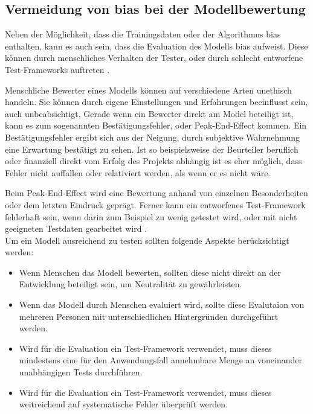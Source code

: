 \documentclass[hidelinks,12pt]{report}
\begin{document}
\subsection{Vermeidung von \Gls{bias}  bei der Modellbewertung}
Neben der Möglichkeit, dass die Trainingsdaten oder der Algorithmus \Gls{bias}  enthalten, kann es auch sein, dass die Evaluation des Modells \Gls{bias}  aufweist.
Diese können durch menschliches Verhalten der Tester, oder durch schlecht entworfene Test-Frameworks auftreten \cite[S. 54f.]{Srinivasan}.

Menschliche Bewerter eines Modells können auf verschiedene Arten unethisch handeln. Sie können durch eigene Einstellungen und Erfahrungen beeinflusst sein, auch unbeabsichtigt.
Gerade wenn ein Bewerter direkt am Model beteiligt ist, kann es zum sogenannten Bestätigungsfehler, oder \glqq Peak-End-Effect\grqq{} kommen. Ein Bestätigungsfehler ergibt sich aus der Neigung, durch subjektive Wahrnehmung eine Erwartung bestätigt zu sehen. Ist so beispielsweise der Beurteiler beruflich oder finanziell direkt vom Erfolg des Projekts abhängig ist es eher möglich, dass Fehler nicht auffallen oder relativiert werden, als wenn er es nicht wäre.

Beim \glqq Peak-End-Effect\grqq{} wird eine Bewertung anhand von einzelnen Besonderheiten oder dem letzten Eindruck geprägt.
Ferner kann ein entworfenes Test-Framework fehlerhaft sein, wenn darin zum Beispiel zu wenig getestet wird, oder mit nicht geeigneten Testdaten gearbeitet wird \cite[S. 54f.]{Srinivasan}.\\

Um ein Modell ausreichend zu testen sollten folgende Aspekte berücksichtigt werden: \\%
\begin{itemize}
    \item Wenn Menschen das Modell bewerten, sollten diese nicht direkt an der Entwicklung beteiligt sein, um Neutralität zu gewährleisten.
    \item Wenn das Modell durch Menschen evaluiert wird, sollte diese Evalutaion von mehreren Personen mit unterschiedlichen Hintergründen durchgeführt werden.
    \item Wird für die Evaluation ein Test-Framework verwendet, muss dieses mindestens eine für den Anwendungsfall annehmbare Menge an voneinander unabhängigen Tests durchführen.
    \item Wird für die Evaluation ein Test-Framework verwendet, muss dieses weitreichend auf systematische Fehler überprüft werden.
\end{itemize}
\end{document}
